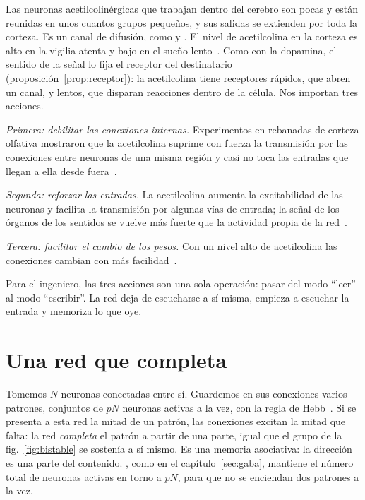 Las neuronas acetilcolinérgicas que trabajan dentro del cerebro son pocas y están reunidas en unos cuantos grupos pequeños, y sus salidas se extienden por toda la corteza. Es un canal de difusión, como  y . El nivel de acetilcolina en la corteza es alto en la vigilia atenta y bajo en el sueño lento~\cite{Hasselmo1999}. Como con la dopamina, el sentido de la señal lo fija el receptor del destinatario (proposición~\ref{prop:receptor}): la acetilcolina tiene receptores rápidos, que abren un canal, y lentos, que disparan reacciones dentro de la célula. Nos importan tres acciones.

\emph{Primera: debilitar las conexiones internas.} Experimentos en rebanadas de corteza olfativa mostraron que la acetilcolina suprime con fuerza la transmisión por las conexiones entre neuronas de una misma región y casi no toca las entradas que llegan a ella desde fuera~\cite{HasselmoBower1992}.

\emph{Segunda: reforzar las entradas.} La acetilcolina aumenta la excitabilidad de las neuronas y facilita la transmisión por algunas vías de entrada; la señal de los órganos de los sentidos se vuelve más fuerte que la actividad propia de la red~\cite{Hasselmo2006}.

\emph{Tercera: facilitar el cambio de los pesos.} Con un nivel alto de acetilcolina las conexiones cambian con más facilidad~\cite{Hasselmo2006}.

Para el ingeniero, las tres acciones son una sola operación: pasar del modo “leer” al modo “escribir”. La red deja de escucharse a sí misma, empieza a escuchar la entrada y memoriza lo que oye.

\section{Una red que completa}

Tomemos $N$ neuronas  conectadas entre sí. Guardemos en sus conexiones varios patrones, conjuntos de $pN$ neuronas activas a la vez, con la regla de Hebb~\cite{Hebb1949}. Si se presenta a esta red la mitad de un patrón, las conexiones excitan la mitad que falta: la red \emph{completa} el patrón a partir de una parte, igual que el grupo de la fig.~\ref{fig:bistable} se sostenía a sí mismo. Es una memoria asociativa: la dirección es una parte del contenido. , como en el capítulo~\ref{sec:gaba}, mantiene el número total de neuronas activas en torno a $pN$, para que no se enciendan dos patrones a la vez.

